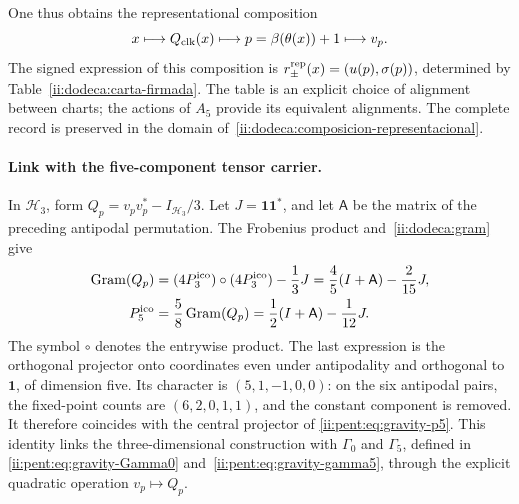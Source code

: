 One thus obtains the representational composition
\begin{equation}
 x\longmapsto Q_{\rm clk}(x)\longmapsto
 p=\beta(\theta(x))+1\longmapsto v_p.
 \label{ii:dodeca:composicion-representacional}
\end{equation}
The signed expression of this composition is
\(r_\pm^{\rm rep}(x)=(u(p),\sigma(p))\), determined by
Table~\eqref{ii:dodeca:carta-firmada}. The table is an explicit choice
of alignment between charts; the actions of \(A_5\) provide its
equivalent alignments. The complete record is preserved in the
domain of~\eqref{ii:dodeca:composicion-representacional}.

\paragraph{Link with the five-component tensor carrier.}
In \(\mathcal H_3\), form
\(Q_p=v_pv_p^*-I_{\mathcal H_3}/3\). Let \(J=\mathbf1\mathbf1^*\),
and let \(\mathsf A\) be the matrix of the preceding antipodal permutation.
The Frobenius product and~\eqref{ii:dodeca:gram} give
\begin{equation}
 \begin{aligned}
 \operatorname{Gram}(Q_p)
 &=(4P_3^{\mathrm{ico}})\circ(4P_3^{\mathrm{ico}})-\frac13J
 =\frac45(I+\mathsf A)-\frac2{15}J,
 \\
 P^{\rm ico}_5&=\frac58\operatorname{Gram}(Q_p)
 =\frac12(I+\mathsf A)-\frac1{12}J.
 \end{aligned}
 \label{ii:dodeca:puente-tensorial}
\end{equation}
The symbol \(\circ\) denotes the entrywise product. The last
expression is the orthogonal projector onto coordinates even under
antipodality and orthogonal to \(\mathbf1\), of dimension five. Its character
is \((5,1,-1,0,0)\): on the six antipodal pairs, the fixed-point
counts are \((6,2,0,1,1)\), and the constant component is removed.
It therefore coincides with the central projector of
\eqref{ii:pent:eq:gravity-p5}. This identity links the three-dimensional
construction with \(\Gamma_0\) and \(\Gamma_5\), defined in
\eqref{ii:pent:eq:gravity-Gamma0} and~\eqref{ii:pent:eq:gravity-gamma5},
through the explicit quadratic operation \(v_p\mapsto Q_p\).

